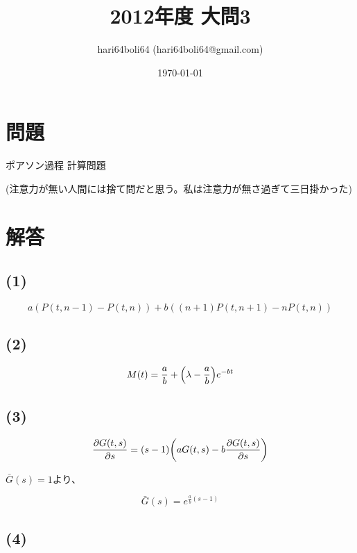 \documentclass[a4paper, 10pt, dvipdfmx]{jlreq}
\begin{document}
\title{2012年度 大問3}
\author{hari64boli64 (hari64boli64@gmail.com)}
\date{\today}
\maketitle

\section{問題}

ポアソン過程 計算問題

(注意力が無い人間には捨て問だと思う。私は注意力が無さ過ぎて三日掛かった)

\section{解答}

\subsection*{(1)}

\begin{equation*}
  a(P(t,n-1)-P(t,n))+b((n+1)P(t,n+1)-nP(t,n))
\end{equation*}

\subsection*{(2)}

\begin{equation*}
  M(t)=\frac{a}{b}+\qty(\lambda-\frac{a}{b})e^{-bt}
\end{equation*}

\subsection*{(3)}

\begin{equation*}
  \pdv{G(t,s)}{s}=(s-1)\qty(aG(t,s)-b\pdv{G(t,s)}{s})
\end{equation*}

$\bar{G}(s)=1$より、

\begin{equation*}
  \bar{G}(s)=e^{\frac{a}{b}(s-1)}
\end{equation*}

\subsection*{(4)}
\end{document}
